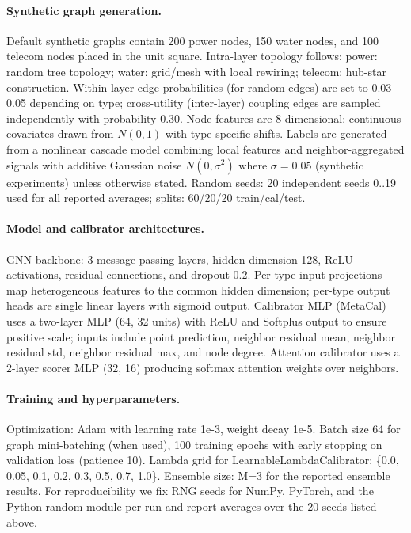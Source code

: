 \documentclass[twoside,11pt]{article}
\begin{document}
\paragraph{Synthetic graph generation.}
Default synthetic graphs contain 200 power nodes, 150 water nodes, and 100
telecom nodes placed in the unit square. Intra-layer topology follows:
power: random tree topology; water: grid/mesh with local rewiring; telecom:
hub-star construction. Within-layer edge probabilities (for random edges)
are set to 0.03–0.05 depending on type; cross-utility (inter-layer)
coupling edges are sampled independently with probability 0.30. Node features
are 8-dimensional: continuous covariates drawn from $N(0,1)$ with type-specific
shifts. Labels are generated from a nonlinear cascade model combining local
features and neighbor-aggregated signals with additive Gaussian noise
$N(0,\sigma^2)$ where $\sigma=0.05$ (synthetic experiments) unless otherwise
stated. Random seeds: 20 independent seeds 0..19 used for all reported
averages; splits: 60/20/20 train/cal/test.

\paragraph{Model and calibrator architectures.}
GNN backbone: 3 message-passing layers, hidden dimension 128, ReLU
activations, residual connections, and dropout 0.2. Per-type input projections
map heterogeneous features to the common hidden dimension; per-type output
heads are single linear layers with sigmoid output. Calibrator MLP (MetaCal)
uses a two-layer MLP (64, 32 units) with ReLU and Softplus output to ensure
positive scale; inputs include point prediction, neighbor residual mean,
neighbor residual std, neighbor residual max, and node degree. Attention
calibrator uses a 2-layer scorer MLP (32, 16) producing softmax attention
weights over neighbors.

\paragraph{Training and hyperparameters.}
Optimization: Adam with learning rate 1e-3, weight decay 1e-5. Batch size 64
for graph mini-batching (when used), 100 training epochs with early stopping on
validation loss (patience 10). Lambda grid for LearnableLambdaCalibrator:
\{0.0, 0.05, 0.1, 0.2, 0.3, 0.5, 0.7, 1.0\}. Ensemble size: M=3 for the
reported ensemble results. For reproducibility we fix RNG seeds for NumPy,
PyTorch, and the Python random module per-run and report averages over the
20 seeds listed above.
\end{document}
